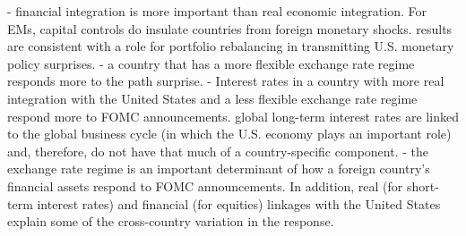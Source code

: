 - financial integration is more important than real economic integration. For EMs, capital controls do insulate countries from foreign monetary shocks. results are consistent with a role for portfolio rebalancing in transmitting U.S. monetary policy surprises. 
- a country that has a more flexible exchange rate regime responds more to the path surprise.
- Interest rates in a country with more real integration with the United States and a less flexible exchange rate regime respond more to FOMC announcements. global long-term interest rates are linked to the global business cycle (in which the U.S. economy plays an important role) and, therefore, do not have that much of a country-specific component.
- the exchange rate regime is an important determinant of how a foreign country’s financial assets respond to FOMC announcements. In addition, real (for short-term interest rates) and financial (for equities) linkages with the United States explain some of the cross-country variation in the response.


